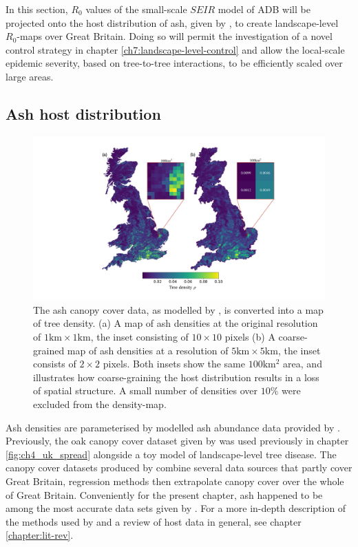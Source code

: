\label{sec:r0-map-construct}
In this section, $R_0$ values of the small-scale $SEIR$ model of ADB will be projected onto the host distribution of ash, 
given by \cite{hill.data}, to create landscape-level $R_0$-maps over Great Britain. 
Doing so will permit the investigation of a novel control strategy in chapter \ref{ch7:landscape-level-control} 
and allow the local-scale epidemic severity, based on tree-to-tree interactions, to be efficiently scaled over large areas.

\subsection{Ash host distribution}

\begin{figure}
    \centering
    \includegraphics[scale=0.45]{chapter6/figures/fig-ash-data.pdf}
    \caption{The ash canopy cover data, as modelled by \cite{hill.data}, is converted into a map of tree density. (a) A map of ash densities at the original resolution of $1\mathrm{km} \times 1\mathrm{km}$, the inset consisting of $10\times 10$ pixels (b) A coarse-grained map of ash densities at a resolution of $5\mathrm{km} \times 5\mathrm{km}$, the inset consists of $2 \times 2$ pixels. Both insets show the same $100\mathrm{km^2}$ area, and illustrates how coarse-graining the host distribution results in a loss of spatial structure. A small number of densities over $10\%$ were excluded from the density-map.}
    \label{fig:ash-host-data}
\end{figure}

Ash densities are parameterised by modelled ash abundance data provided by \cite{hill.data}. 
Previously, the oak canopy cover dataset given by \cite{hill.data} was used previously in chapter \ref{fig:ch4_uk_spread} alongside a toy model of landscape-level tree disease.
The canopy cover datasets produced by \cite{hill.data} combine several data sources that partly cover Great Britain, 
regression methods then extrapolate canopy cover over the whole of Great Britain.
Conveniently for the present chapter, ash happened to be among the most accurate data sets given by \cite{hill.data}. 
For a more in-depth description of the methods used by \cite{hill.data} and a review of host data in general, see chapter \ref{chapter:lit-rev}.

